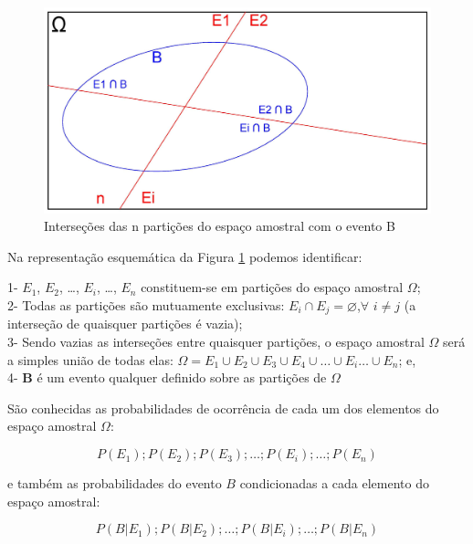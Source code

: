 \documentclass[
]{book}
\begin{document}
\hfill\break

\begin{figure}

{\centering \includegraphics[width=0.8\linewidth]{images4/bayes_5} 

}

\caption{Interseções das n partições do espaço amostral com o evento B}\label{fig:fig10}
\end{figure}

\hfill\break

Na representação esquemática da Figura \ref{fig:fig10} podemos identificar:

1- \(E_{1}\), \(E_{2}\), \dots , \(E_{i}\), \dots, \(E_{n}\) constituem-se em partições do espaço amostral \(\Omega\);\\
2- Todas as partições são mutuamente exclusivas: \(E_{i} \cap E_{j} = \varnothing\),\(\forall\) \(i \neq j\) (a interseção de quaisquer partições é vazia);\\
3- Sendo vazias as interseções entre quaisquer partições, o espaço amostral \(\Omega\) será a simples união de todas elas: \(\Omega = E_{1} \cup E_{2} \cup E_{3} \cup E_{4}\cup \dots \cup E_{i} \dots \cup E_{n}\); e,\\
4- \textbf{B} é um evento qualquer definido sobre as partições de \(\Omega\)

\hfill\break

São conhecidas as probabilidades de ocorrência de cada um dos elementos do espaço amostral \(\Omega\):

\hfill\break

\[
P(E_{1}); P(E_{2}); P(E_{3}); \dots;P(E_{i}); \dots; P(E_{n})
\]

\hfill\break

e também as probabilidades do evento \(B\) condicionadas a cada elemento do espaço amostral:

\hfill\break

\[
P(B|E_{1}); P(B|E_{2});\dots;P(B|E_{i});\dots; P(B|E_{n})
\]
\end{document}
